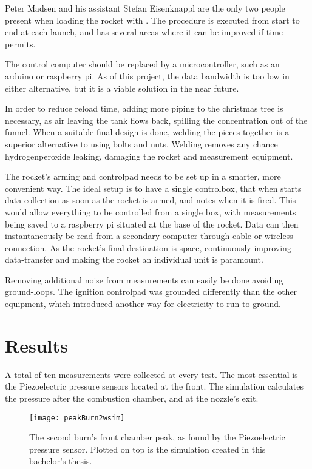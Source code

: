 Peter Madsen and his assistant Stefan Eisenknappl are the only two people present when loading the rocket with . The procedure is executed from start to end at each launch, and has several areas where it can be improved if time permits.

The control computer should be replaced by a microcontroller, such as an arduino or raspberry pi. As of this project, the data bandwidth is too low in either alternative, but it is a viable solution in the near future.

In order to reduce reload time, adding more piping to the christmas tree is necessary, as air leaving the  tank flows back, spilling the  concentration out of the funnel. When a suitable final design is done, welding the pieces together is a superior alternative to using bolts and nuts. Welding removes any chance hydrogenperoxide leaking, damaging the rocket and measurement equipment.

The rocket's arming and controlpad needs to be set up in a smarter, more convenient way. The ideal setup is to have a single controlbox, that when starts data-collection as soon as the rocket is armed, and notes when it is fired. This would allow everything to be controlled from a single box, with measurements being saved to a raspberry pi situated at the base of the rocket. Data can then instantaneously be read from a secondary computer through cable or wireless connection. As the rocket's final destination is space, continuously improving data-transfer and making the rocket an individual unit is paramount.

Removing additional noise from measurements can easily be done avoiding ground-loops. The ignition controlpad was grounded differently than the other equipment, which introduced another way for electricity to run to ground.

\section{Results}

A total of ten measurements were collected at every test. The most essential is the Piezoelectric pressure sensors located at the front. The simulation calculates the pressure after the combustion chamber, and at the nozzle's exit.

\begin{figure}
	\centering
	\texttt{[image: peakBurn2wsim]}
	\caption{The second burn's front chamber peak, as found by the Piezoelectric pressure sensor. Plotted on top is the simulation created in this bachelor's thesis.}
	\label{fig:peakBurn2wsim}
\end{figure}


